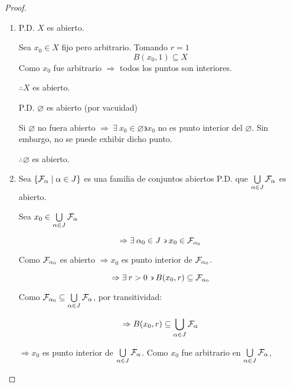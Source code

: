 \begin{proof}
\
    \begin{enumerate}
    
        \item P.D. $X$ es abierto.

        Sea ${x}_{0} \in X$ fijo pero arbitrario. Tomando $r=1$
        \begin{equation*}
            {B}({x}_{0}, 1) \subseteq X
        \end{equation*}
        Como ${x}_{0}$ fue arbitrario $\Rightarrow$ todos los puntos son interiores.

        $\therefore X$ es abierto.

        P.D. $\varnothing$ es abierto (por vacuidad)

        Si $\varnothing$ no fuera abierto $\Rightarrow \: \exists \: {x}_{0} \in \varnothing \backepsilon {x}_{0}$ no es punto interior del $\varnothing$. Sin embargo, no se puede exhibir dicho punto.

        $\therefore \varnothing$ es abierto.

        \item Sea  $\{ {\mathcal{F}}_{\alpha} \mid \alpha \in J \}$ es una familia de conjuntos abiertos P.D. que $\bigcup\limits_{\alpha \in J} {\mathcal{F}}_{\alpha}$ es abierto.

        Sea ${x}_{0} \in \bigcup\limits_{\alpha \in J} {\mathcal{F}}_{\alpha}$

        \begin{equation*}
            \Rightarrow \exists \: {\alpha}_{0} \in J \backepsilon {x}_{0} \in {\ensuremath{\mathcal{F}}}_{{\alpha}_{0}}
        \end{equation*}

        Como ${\mathcal{F}}_{{\alpha}_{0}}$ es abierto $\Rightarrow {x}_{0}$ es punto interior de ${\mathcal{F}}_{{\alpha}_{0}}$.

        \begin{equation*}
            \Rightarrow \exists \: r > 0 \backepsilon {B}({x}_{0}, r) \subseteq {\ensuremath{\mathcal{F}}}_{{\alpha}_{0}}
        \end{equation*}

        Como ${\mathcal{F}}_{{\alpha}_{0}} \subseteq \bigcup\limits_{\alpha \in J} {\mathcal{F}}_{\alpha}$, por transitividad:

        \begin{equation*}
            \Rightarrow  {B}({x}_{0}, r) \subseteq \bigcup_{\alpha \in J} {\mathcal{F}}_{\alpha}
        \end{equation*}

        $\Rightarrow {x}_{0}$ es punto interior de $\bigcup\limits_{\alpha \in J} {\mathcal{F}}_{\alpha}$. Como ${x}_{0}$ fue arbitrario en $\bigcup\limits_{\alpha \in J} {\mathcal{F}}_{\alpha}$,


\end{enumerate}
\end{proof}
